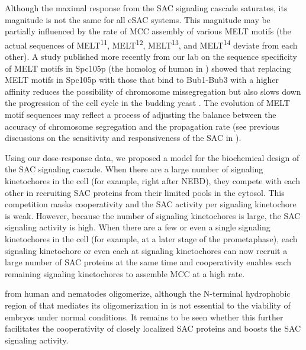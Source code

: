 Although the maximal response from the SAC signaling cascade saturates, its magnitude is not the same for all eSAC systems. This magnitude may be partially influenced by the rate of MCC assembly of various MELT motifs (the actual sequences of MELT\textsuperscript{11}, MELT\textsuperscript{12}, MELT\textsuperscript{13}, and MELT\textsuperscript{14} deviate from each other). A study published more recently from our lab on the sequence specificity of MELT motifs in Spc105p (the homolog of human  in ) showed that replacing MELT motifs in Spc105p with those that bind to Bub1-Bub3 with a higher affinity reduces the possibility of chromosome missegregation but also slows down the progression of the cell cycle in the budding yeast \cite{YeastMELTSpecificity}. The evolution of MELT motif sequences may reflect a process of adjusting the balance between the accuracy of chromosome segregation and the propagation rate \cite{MELTEvolution} (see previous discussions on the sensitivity and responsiveness of the SAC in ).

Using our dose-response data, we proposed a model for the biochemical design of the SAC signaling cascade. When there are a large number of signaling kinetochores in the cell (for example, right after NEBD), they compete with each other in recruiting SAC proteins from their limited pools in the cytosol. This competition masks cooperativity and the SAC activity per signaling kinetochore is weak. However, because the number of signaling kinetochores is large, the SAC signaling activity is high. When there are a few or even a single signaling kinetochores in the cell (for example, at a later stage of the prometaphase), each signaling kinetochore or even each  at signaling kinetochores can now recruit a large number of SAC proteins at the same time and cooperativity enables each remaining signaling kinetochores to assemble MCC at a high rate.

 from human and nematodes \cite{WormKnl1Oligomer,Knl1CTer} oligomerize, although the N-terminal hydrophobic region of  that mediates its oligomerization in  is not essential to the viability of embryos under normal conditions. It remains to be seen whether this further facilitates the cooperativity of closely localized SAC proteins and boosts the SAC signaling activity.

